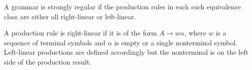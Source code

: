 A grammar is strongly regular if the production rules in each such equivalence class are either all right-linear or left-linear.

A production rule is right-linear if it is of the form $A \rightarrow w \alpha$, where $w$ is a sequence of terminal symbols and $\alpha$ is empty or a single nonterminal symbol. Left-linear productions are defined accordingly but the nonterminal is on the left side of the production result.


